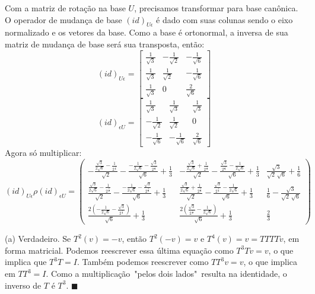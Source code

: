 \documentclass{homework}
\begin{document}
Com a matriz de rotação na base $U$, precisamos transformar para base canônica. O operador de mudança de base $(id)_{U\epsilon}$ é dado com suas colunas sendo o eixo normalizado e os vetores da base. Como a base é ortonormal, a inversa de sua matriz de mudança de base será sua transposta, então:
\[(id)_{U\epsilon} = \begin{bmatrix}
\frac{1}{\sqrt{3}} & -\frac{1}{\sqrt{2}} & -\frac{1}{\sqrt{6}}\\
\frac{1}{\sqrt{3}} & \frac{1}{\sqrt{2}} & -\frac{1}{\sqrt{6}}\\
\frac{1}{\sqrt{3}} & 0 & \frac{2}{\sqrt{6}}
\end{bmatrix}\]
\[(id)_{\epsilon U} = \begin{bmatrix}
\frac{1}{\sqrt{3}} & \frac{1}{\sqrt{3}} & \frac{1}{\sqrt{3}}\\
-\frac{1}{\sqrt{2}} & \frac{1}{\sqrt{2}} & 0\\
-\frac{1}{\sqrt{6}} & -\frac{1}{\sqrt{6}} & \frac{2}{\sqrt{6}}
\end{bmatrix}\]
Agora só multiplicar:
\[(id)_{U\epsilon} \rho (id)_{\epsilon U} = \begin{pmatrix}-\frac{\frac{\sqrt{3}}{2 \sqrt{6}}-\frac{1}{{{2}^{\frac{3}{2}}}}}{\sqrt{2}}-\frac{-\frac{1}{2 \sqrt{6}}-\frac{\sqrt{3}}{{{2}^{\frac{3}{2}}}}}{\sqrt{6}}+\frac{1}{3} & -\frac{\frac{\sqrt{3}}{2 \sqrt{6}}+\frac{1}{{{2}^{\frac{3}{2}}}}}{\sqrt{2}}-\frac{\frac{\sqrt{3}}{{{2}^{\frac{3}{2}}}}-\frac{1}{2 \sqrt{6}}}{\sqrt{6}}+\frac{1}{3} & \frac{\sqrt{3}}{\sqrt{2}\, \sqrt{6}}+\frac{1}{6}\\
\frac{\frac{\sqrt{3}}{2 \sqrt{6}}-\frac{1}{{{2}^{\frac{3}{2}}}}}{\sqrt{2}}-\frac{-\frac{1}{2 \sqrt{6}}-\frac{\sqrt{3}}{{{2}^{\frac{3}{2}}}}}{\sqrt{6}}+\frac{1}{3} & \frac{\frac{\sqrt{3}}{2 \sqrt{6}}+\frac{1}{{{2}^{\frac{3}{2}}}}}{\sqrt{2}}-\frac{\frac{\sqrt{3}}{{{2}^{\frac{3}{2}}}}-\frac{1}{2 \sqrt{6}}}{\sqrt{6}}+\frac{1}{3} & \frac{1}{6}-\frac{\sqrt{3}}{\sqrt{2}\, \sqrt{6}}\\
\frac{2 \left( -\frac{1}{2 \sqrt{6}}-\frac{\sqrt{3}}{{{2}^{\frac{3}{2}}}}\right) }{\sqrt{6}}+\frac{1}{3} & \frac{2 \left( \frac{\sqrt{3}}{{{2}^{\frac{3}{2}}}}-\frac{1}{2 \sqrt{6}}\right) }{\sqrt{6}}+\frac{1}{3} & \frac{2}{3}\end{pmatrix}\]

\exercise*
(a) Verdadeiro. Se $T^2(v) = -v$, então $T^2(-v) = v$ e $T^4(v) = v = TTTTv$, em forma matricial. Podemos reescrever essa última equação como $T^3Tv = v$, o que implica que $T^3T = I$. Também podemos reescrever como $TT^3v = v$, o que implica em $TT^3 = I$. Como a multiplicação\, "pelos dois lados"\, resulta na identidade, o inverso de $T$ é $T^3$. $\blacksquare$
\end{document}
